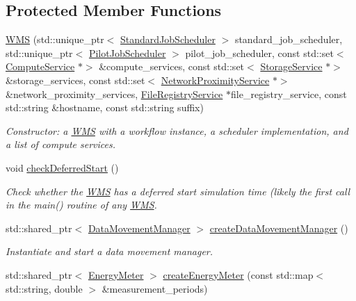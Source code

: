 \subsection*{Protected Member Functions}
\begin{DoxyCompactItemize}
\item 
\hyperlink{classwrench_1_1_w_m_s_a385a87e02d2e6bd7e70624532bca3bdc}{W\+MS} (std\+::unique\+\_\+ptr$<$ \hyperlink{classwrench_1_1_standard_job_scheduler}{Standard\+Job\+Scheduler} $>$ standard\+\_\+job\+\_\+scheduler, std\+::unique\+\_\+ptr$<$ \hyperlink{classwrench_1_1_pilot_job_scheduler}{Pilot\+Job\+Scheduler} $>$ pilot\+\_\+job\+\_\+scheduler, const std\+::set$<$ \hyperlink{classwrench_1_1_compute_service}{Compute\+Service} $\ast$$>$ \&compute\+\_\+services, const std\+::set$<$ \hyperlink{classwrench_1_1_storage_service}{Storage\+Service} $\ast$$>$ \&storage\+\_\+services, const std\+::set$<$ \hyperlink{classwrench_1_1_network_proximity_service}{Network\+Proximity\+Service} $\ast$$>$ \&network\+\_\+proximity\+\_\+services, \hyperlink{classwrench_1_1_file_registry_service}{File\+Registry\+Service} $\ast$file\+\_\+registry\+\_\+service, const std\+::string \&hostname, const std\+::string suffix)
\begin{DoxyCompactList}\small\item\em Constructor\+: a \hyperlink{classwrench_1_1_w_m_s}{W\+MS} with a workflow instance, a scheduler implementation, and a list of compute services. \end{DoxyCompactList}\item 
void \hyperlink{classwrench_1_1_w_m_s_ac264b461c6f5900b96a1c9e33f7f4d58}{check\+Deferred\+Start} ()
\begin{DoxyCompactList}\small\item\em Check whether the \hyperlink{classwrench_1_1_w_m_s}{W\+MS} has a deferred start simulation time (likely the first call in the main() routine of any \hyperlink{classwrench_1_1_w_m_s}{W\+MS}. \end{DoxyCompactList}\item 
std\+::shared\+\_\+ptr$<$ \hyperlink{classwrench_1_1_data_movement_manager}{Data\+Movement\+Manager} $>$ \hyperlink{classwrench_1_1_w_m_s_aaf8902aadfd0542509cd0cae5519bcf3}{create\+Data\+Movement\+Manager} ()
\begin{DoxyCompactList}\small\item\em Instantiate and start a data movement manager. \end{DoxyCompactList}\item 
std\+::shared\+\_\+ptr$<$ \hyperlink{classwrench_1_1_energy_meter}{Energy\+Meter} $>$ \hyperlink{classwrench_1_1_w_m_s_a4bcbecc3ae781f439d3c9979a5feb9de}{create\+Energy\+Meter} (const std\+::map$<$ std\+::string, double $>$ \&measurement\+\_\+periods)
$$
\end{DoxyCompactItemize}

